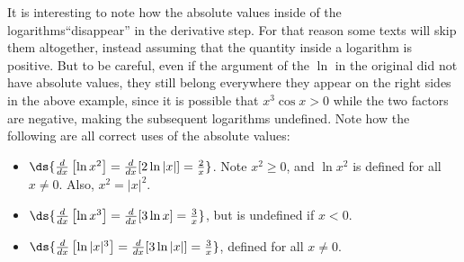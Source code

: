It is interesting to note how the absolute values inside
of the logarithms``disappear''
in the derivative step.  For that reason some texts
will skip them altogether, instead assuming that the quantity
inside a logarithm is positive.  But to be careful, even if the
argument of the $\ln$ in the original did not have absolute
values, they still belong everywhere they appear on the right sides
in the above example, since it is possible that $x^3\cos x>0$
while the two factors are negative, making the subsequent logarithms
undefined.  Note how the following are all correct uses of the
absolute values:
\begin{itemize}
\item $\ds{\frac{d}{dx}\left[\ln x^2\right]=\frac{d}{dx}[2\ln|x|]=\frac2x}$.
 Note $x^2\ge0$, and $\ln x^2$ is defined for all $x\ne0$.  Also,
 $x^2=|x|^2$.
\item $\ds{\frac{d}{dx}\left[\ln x^3\right]=\frac{d}{dx}[3\ln x]=\frac3x}$,
 but is undefined if $x<0$.
\item $\ds{\frac{d}{dx}\left[\ln|x|^3\right]=\frac{d}{dx}[3\ln|x|]=\frac3x}$,
 defined for all $x\ne0$.
\end{itemize}



